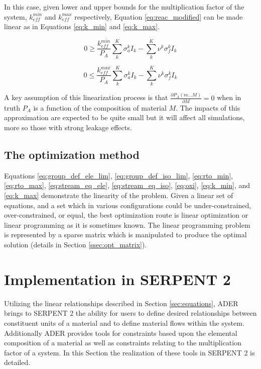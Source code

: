In this case, given lower and upper bounds for the multiplication factor of the
system, $k_{eff}^{min}$ and $k_{eff}^{max}$ respectively, 
Equation \ref{eq:reac_modified} can be  made linear as in 
Equations \ref{eq:k_min} and \ref{eq:k_max}.

\begin{equation}
\label{eq:k_min}
0 \geq \frac{k_{eff}^{min}}{P_{A}} \sum \limits_{k}^{K} \sigma_{a}^{k} I_{k} - \sum \limits_{k}^{K} \nu^{k} \sigma_{f}^{k} I_{k}
\end{equation}

\begin{equation}
\label{eq:k_max}
0 \leq \frac{k_{eff}^{max}}{P_{A}} \sum \limits_{k}^{K} \sigma_{a}^{k} I_{k} - \sum \limits_{k}^{K} \nu^{k} \sigma_{f}^{k} I_{k}
\end{equation}

A key assumption of this linearization process is that 
$\frac{\partial P_{A}(m...M)}{\partial M} = 0$ when in truth
$P_{A}$ is a function of the composition of material $M$. 
The impacts of this approximation are expected to be quite small but it will 
affect all simulations, more so those with strong leakage effects.
%

\subsection{The optimization method} \label{ssec:opt}
Equations \ref{eq:group_def_ele_lim}, \ref{eq:group_def_iso_lim}, 
\ref{eq:rto_min}, \ref{eq:rto_max}, \ref{eq:stream_eq_ele}, 
\ref{eq:stream_eq_iso}, \ref{eq:oxi}, \ref{eq:k_min}, and \ref{eq:k_max} 
demonstrate the linearity of the problem.  Given a linear
set of equations, and a set which in various configurations could be
under-constrained, over-constrained, or equal, the best optimization route is
linear optimization or linear programming as it is sometimes known. The linear
programming problem is represented by a sparse matrix which is manipulated to 
produce the optimal solution (details in Section \ref{ssec:opt_matrix}).


\section{Implementation in SERPENT 2} \label{sec:implementation}
Utilizing the linear relationships described in 
Section \ref{sec:equations}, ADER brings to SERPENT 2 the ability for
users to define desired relationships between constituent units of a material 
and to define material flows within
the system. Additionally ADER provides tools for constraints based upon the 
elemental composition of a material
as well as constraints relating to the multiplication factor of a system. 
In this Section the realization of these tools in SERPENT 2 is detailed.



